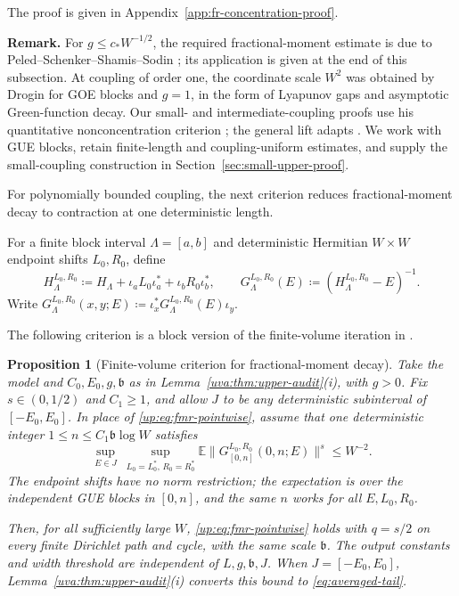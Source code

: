 \documentclass[11pt]{article}
\numberwithin{equation}{section}
\newtheorem{proposition}[theorem]{Proposition}
\theoremstyle{remark}
\newcommand{\E}{\mathbb E}
\begin{document}
The proof is given in Appendix~\ref{app:fr-concentration-proof}.

\noindent\textbf{Remark.}
For $g\le c_*W^{-1/2}$, the required fractional-moment estimate
is due to Peled--Schenker--Shamis--Sodin \cite[Theorem~1]{PSSS};
its application is given at the end of this subsection. At coupling of
order one, the coordinate scale $W^2$ was obtained by Drogin
\cite[Theorem~1.2 and Corollary~1.4]{Drogin} for GOE blocks and $g=1$,
in the form of Lyapunov gaps and asymptotic Green-function decay.
Our small- and intermediate-coupling proofs use his quantitative
nonconcentration criterion
\cite[Proposition~2.6 and Claims~2.7--2.8]{Drogin}; the general lift
adapts \cite[Proposition~4.4]{Drogin}.
We work with GUE blocks, retain finite-length and coupling-uniform
estimates, and supply the small-coupling construction in
Section~\ref{sec:small-upper-proof}.

For polynomially bounded coupling, the next criterion reduces
fractional-moment decay to contraction at one deterministic length.

For a finite block interval $\Lambda=[a,b]$ and deterministic Hermitian
$W\times W$ endpoint shifts $L_0,R_0$, define
\begin{equation}\label{up:eq:shifted-resolvent}
 H_\Lambda^{L_0,R_0}\coloneqq H_\Lambda+\iota_aL_0\iota_a^*
                       +\iota_bR_0\iota_b^*,\qquad
 G_\Lambda^{L_0,R_0}(E)\coloneqq(H_\Lambda^{L_0,R_0}-E)^{-1}.
\end{equation}
Write $G_\Lambda^{L_0,R_0}(x,y;E)\coloneqq
\iota_x^*G_\Lambda^{L_0,R_0}(E)\iota_y$.

The following criterion is a block version of the finite-volume
iteration in \cite[proof of Theorem~1.1, (2.23)--(2.24)]{ASFH}.

\begin{proposition}[Finite-volume criterion for fractional-moment decay]
\label{up:prop:fr-concentration}
Take the model and $C_0,E_0,g,\mathfrak b$ as in
Lemma~\ref{uva:thm:upper-audit}\textup{(i)}, with $g>0$.
Fix $s\in(0,1/2)$ and $C_1\ge1$, and allow $J$ to be any deterministic subinterval
of $[-E_0,E_0]$. In place of \eqref{up:eq:fmr-pointwise}, assume that
one deterministic integer $1\le n\le C_1\mathfrak b\log W$ satisfies
\begin{equation}\label{uv:eq:upper-volume-input}
 \sup_{E\in J}\ \sup_{L_0=L_0^*,\,R_0=R_0^*}
 \E\|G_{[0,n]}^{L_0,R_0}(0,n;E)\|^s\le W^{-2}.
\end{equation}
The endpoint shifts have no norm restriction; the expectation is over
the independent GUE blocks in $[0,n]$, and the same $n$ works for all
$E,L_0,R_0$.

Then, for all sufficiently large $W$, \eqref{up:eq:fmr-pointwise}
holds with $q=s/2$ on every finite Dirichlet path and cycle, with the
same scale $\mathfrak b$. The output constants and width threshold are
independent of $L,g,\mathfrak b,J$.
When $J=[-E_0,E_0]$, Lemma~\ref{uva:thm:upper-audit}\textup{(i)}
converts this bound to \eqref{eq:averaged-tail}.
\end{proposition}
\end{document}
